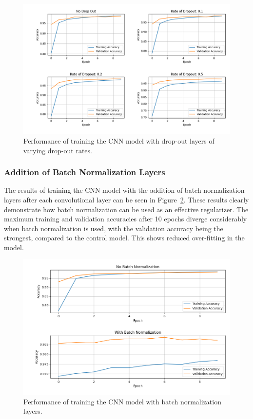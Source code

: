 \documentclass[a4paper]{article}
\begin{document}
\begin{figure}[h]
    \centering
    \includegraphics[scale=0.5]{images/drop-out-cnn.png}
    \caption{Performance of training the CNN model with drop-out layers of varying drop-out rates.}
    \label{fig:drop-out}
\end{figure}

\subsubsection{Addition of Batch Normalization Layers}

The results of training the CNN model with the addition of batch normalization layers after each convolutional layer can be seen in Figure~\ref{fig:batch-norm}. These results clearly demonstrate how batch normalization can be used as an effective regularizer. The maximum training and validation accuracies after 10 epochs diverge considerably when batch normalization is used, with the validation accuracy being the strongest, compared to the control model. This shows reduced over-fitting in the model.

\begin{figure}[h]
    \centering
    \includegraphics[scale=0.5]{images/batch-norm-cnn.png}
    \caption{Performance of training the CNN model with batch normalization layers.}
    \label{fig:batch-norm}
\end{figure}
\end{document}
